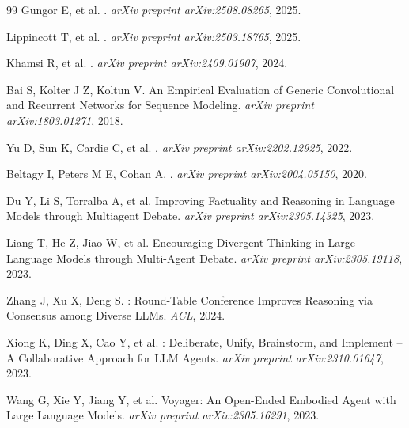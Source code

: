 \documentclass[12pt,a4paper]{ctexart}
\begin{document}
\begin{thebibliography}{99}
Gungor E, et al.
.
\newblock \emph{arXiv preprint arXiv:2508.08265}, 2025.

Lippincott T, et al.
.
\newblock \emph{arXiv preprint arXiv:2503.18765}, 2025.

Khamsi R, et al.
.
\newblock \emph{arXiv preprint arXiv:2409.01907}, 2024.

Bai S, Kolter J Z, Koltun V.
\newblock An Empirical Evaluation of Generic Convolutional and Recurrent Networks for Sequence Modeling.
\newblock \emph{arXiv preprint arXiv:1803.01271}, 2018.

Yu D, Sun K, Cardie C, et al.
.
\newblock \emph{arXiv preprint arXiv:2202.12925}, 2022.

Beltagy I, Peters M E, Cohan A.
.
\newblock \emph{arXiv preprint arXiv:2004.05150}, 2020.

Du Y, Li S, Torralba A, et al.
\newblock Improving Factuality and Reasoning in Language Models through Multiagent Debate.
\newblock \emph{arXiv preprint arXiv:2305.14325}, 2023.

Liang T, He Z, Jiao W, et al.
\newblock Encouraging Divergent Thinking in Large Language Models through Multi-Agent Debate.
\newblock \emph{arXiv preprint arXiv:2305.19118}, 2023.

Zhang J, Xu X, Deng S.
: Round-Table Conference Improves Reasoning via Consensus among Diverse LLMs.
\newblock \emph{ACL}, 2024.

Xiong K, Ding X, Cao Y, et al.
: Deliberate, Unify, Brainstorm, and Implement -- A Collaborative Approach for LLM Agents.
\newblock \emph{arXiv preprint arXiv:2310.01647}, 2023.

Wang G, Xie Y, Jiang Y, et al.
\newblock Voyager: An Open-Ended Embodied Agent with Large Language Models.
\newblock \emph{arXiv preprint arXiv:2305.16291}, 2023.


\end{thebibliography}
\end{document}
